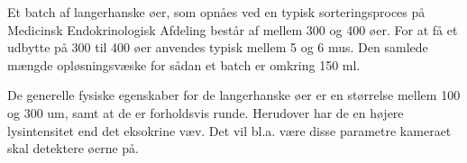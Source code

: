 Et batch af langerhanske øer, som opnåes ved en typisk sorteringsproces på Medicinsk Endokrinologisk Afdeling består af mellem 300 og 400 øer. For at få et udbytte på 300 til 400 øer anvendes typisk mellem 5 og 6 mus. Den samlede mængde opløsningsvæske for sådan et batch er omkring 150 ml.

De generelle fysiske egenskaber for de langerhanske øer er en størrelse mellem 100 og 300 um, samt at de er forholdsvis runde. Herudover har de en højere lysintensitet end det eksokrine væv. Det vil bl.a. være disse parametre kameraet skal detektere øerne på.





